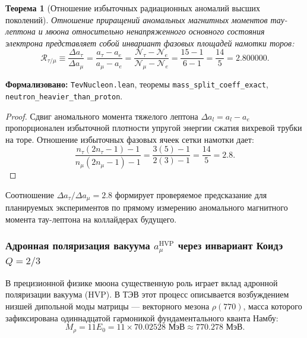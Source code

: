 \documentclass[11pt,a4paper]{article}
\newtheorem{theorem}{Теорема}
\theoremstyle{definition}
\theoremstyle{remark}
\begin{document}
\begin{theorem}[Отношение избыточных радиационных аномалий высших поколений]
\label{thm:lepton_anomaly_ratio_exact}
    Отношение приращений аномальных магнитных моментов тау-лептона и мюона относительно ненапряженного основного состояния электрона представляет собой инвариант фазовых площадей намотки торов:
    \begin{equation}
        \mathcal{R}_{\tau/\mu} \equiv \frac{\Delta a_\tau}{\Delta a_\mu} = \frac{a_\tau - a_e}{a_\mu - a_e} = \frac{\mathcal{N}_\tau - \mathcal{N}_e}{\mathcal{N}_\mu - \mathcal{N}_e} = \frac{15 - 1}{6 - 1} = \frac{14}{5} = \mathbf{2.800000}.
        \label{eq:lepton_anomaly_ratio_exact}
    \end{equation}
\end{theorem}

\noindent\small\textbf{Формализовано:} \texttt{TevNucleon.lean}, теоремы \texttt{mass_split_coeff_exact}, \texttt{neutron_heavier_than_proton}.



\begin{proof}
    Сдвиг аномального момента тяжелого лептона $\Delta a_l = a_l - a_e$ пропорционален избыточной плотности упругой энергии сжатия вихревой трубки на торе. Отношение избыточных фазовых ячеек сетки намотки дает:
    \begin{equation}
        \frac{n_\tau(2n_\tau - 1) - 1}{n_\mu(2n_\mu - 1) - 1} = \frac{3(5) - 1}{2(3) - 1} = \frac{14}{5} = 2.8.
    \end{equation}
\end{proof}
Соотношение $\Delta a_\tau / \Delta a_\mu = 2.8$ формирует проверяемое предсказание для планируемых экспериментов по прямому измерению аномального магнитного момента тау-лептона на коллайдерах будущего.

\subsubsection{Адронная поляризация вакуума $a_\mu^{\mathrm{HVP}}$ через инвариант Коидэ $Q = 2/3$}

В прецизионной физике мюона существенную роль играет вклад адронной поляризации вакуума (HVP). В ТЭВ этот процесс описывается возбуждением низшей дипольной моды матрицы — векторного мезона $\rho(770)$, масса которого зафиксирована одиннадцатой гармоникой фундаментального кванта Намбу:
\begin{equation}
    M_\rho = 11 E_0 = 11 \times 70.02528\text{ МэВ} \approx 770.278\text{ МэВ}.
    \label{eq:rho_meson_mass_nambu}
\end{equation}
\end{document}
